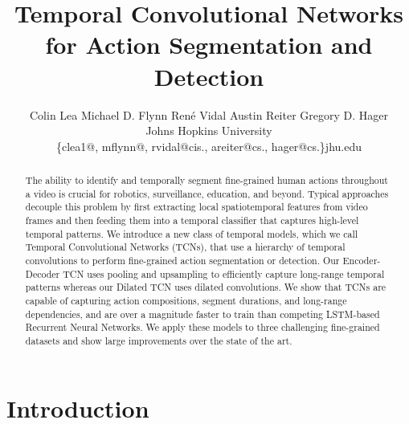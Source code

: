 \documentclass[10pt,twocolumn,letterpaper]{article}
\begin{document}
\title{Temporal Convolutional Networks\\ for Action Segmentation and Detection}


\author{Colin Lea 
	\hspace{11px} Michael D. Flynn 
	\hspace{11px} Ren\'{e} Vidal  
	\hspace{11px} Austin Reiter
	\hspace{11px} Gregory D. Hager  \\	
Johns Hopkins University \\
	 \{clea1@, mflynn@, rvidal@cis., areiter@cs., hager@cs.\}jhu.edu
}




\maketitle


\begin{abstract}

The ability to identify and temporally segment fine-grained human actions throughout a video is crucial for robotics, surveillance, education, and beyond.
Typical approaches decouple this problem by first extracting local spatiotemporal features from video frames and then feeding them into a temporal classifier that captures high-level temporal patterns.
We introduce a new class of temporal models, which we call Temporal Convolutional Networks (TCNs), that use a hierarchy of temporal convolutions to perform fine-grained action segmentation or detection.
Our Encoder-Decoder TCN uses pooling and upsampling to efficiently capture long-range temporal patterns whereas our Dilated TCN uses dilated convolutions. 
We show that TCNs are capable of capturing action compositions, segment durations, and long-range dependencies, and are over a magnitude faster to train than competing LSTM-based Recurrent Neural Networks.
We apply these models to three challenging fine-grained datasets and show large improvements over the state of the art. 





















\end{abstract} \section{Introduction}
\label{sec:intro}
\end{document}
